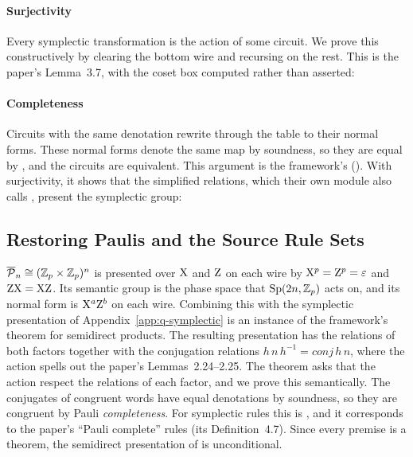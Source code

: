 \documentclass[acmsmall,screen,nonacm]{acmart}
\begin{document}
\paragraph{Surjectivity} Every symplectic transformation is the action of some circuit. We prove this constructively by clearing the bottom wire and recursing on the rest. This is the paper's Lemma~3.7, with the coset box computed rather than asserted:

{\renewcommand{\AgdaCodeStyle}{\scriptsize}}

\paragraph{Completeness} Circuits with the same denotation rewrite through the table to their normal forms. These normal forms denote the same map by soundness, so they are equal by , and the circuits are equivalent. This argument is the framework's  (). With surjectivity, it shows that the simplified relations, which their own module also calls , present the symplectic group:



\subsection{Restoring Paulis and the Source Rule Sets}\label{app:q-composing}

$\overline{\mathcal{P}}_{n} \cong (\mathbb{Z}_p \times \mathbb{Z}_p)^n$ is presented over $\mathrm{X}$ and $\mathrm{Z}$ on each wire by $\mathrm{X}^{p} = \mathrm{Z}^{p} = \varepsilon$ and $\mathrm{Z}\mathrm{X} = \mathrm{X}\mathrm{Z}$. Its semantic group is the phase space that $\mathrm{Sp}(2n,\mathbb{Z}_p)$ acts on, and its normal form is $\mathrm{X}^{a}\mathrm{Z}^{b}$ on each wire. Combining this with the symplectic presentation of Appendix~\ref{app:q-symplectic} is an instance of the framework's theorem for semidirect products. The resulting presentation has the relations of both factors together with the conjugation relations $h\,n\,h^{-1} = \mathit{conj}\,h\,n$, where the action  spells out the paper's Lemmas~2.24--2.25. The theorem asks that the action respect the relations of each factor, and we prove this semantically. The conjugates of congruent words have equal denotations by soundness, so they are congruent by Pauli \emph{completeness}. For symplectic rules this is , and it corresponds to the paper's ``Pauli complete'' rules (its Definition~4.7). Since every premise is a theorem, the semidirect presentation of  is unconditional.
\end{document}
